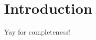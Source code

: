 \documentclass[open-logic-section]{subfiles}
\begin{document}
\section{Introduction}

Yay for completeness!
\end{document}
